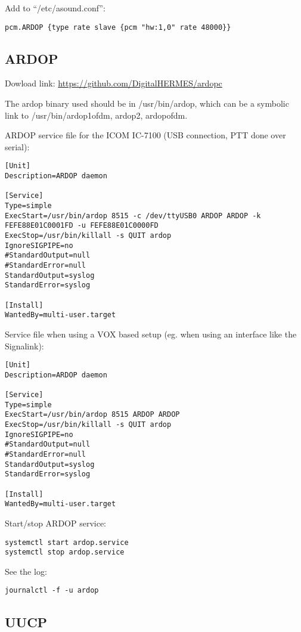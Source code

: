 \documentclass[11pt,a4paper]{article}
\begin{document}
Add to ``/etc/asound.conf'':
\begin{verbatim}
pcm.ARDOP {type rate slave {pcm "hw:1,0" rate 48000}}
\end{verbatim}

\subsection{ARDOP}

Dowload link: \url{https://github.com/DigitalHERMES/ardopc}

The ardop binary used should be in /usr/bin/ardop, which can be a
symbolic link to /usr/bin/{ardop1ofdm, ardop2, ardopofdm}.

ARDOP service file for the ICOM IC-7100 (USB connection, PTT done over serial):
\begin{verbatim}
[Unit]
Description=ARDOP daemon

[Service]
Type=simple
ExecStart=/usr/bin/ardop 8515 -c /dev/ttyUSB0 ARDOP ARDOP -k FEFE88E01C0001FD -u FEFE88E01C0000FD
ExecStop=/usr/bin/killall -s QUIT ardop
IgnoreSIGPIPE=no
#StandardOutput=null
#StandardError=null
StandardOutput=syslog
StandardError=syslog

[Install]
WantedBy=multi-user.target
\end{verbatim}

Service file when using a VOX based setup (eg. when using an interface like
the Signalink):
\begin{verbatim}
[Unit]
Description=ARDOP daemon

[Service]
Type=simple
ExecStart=/usr/bin/ardop 8515 ARDOP ARDOP
ExecStop=/usr/bin/killall -s QUIT ardop
IgnoreSIGPIPE=no
#StandardOutput=null
#StandardError=null
StandardOutput=syslog
StandardError=syslog

[Install]
WantedBy=multi-user.target
\end{verbatim}


Start/stop ARDOP service:
\begin{verbatim}
systemctl start ardop.service
systemctl stop ardop.service
\end{verbatim}


See the log:
\begin{verbatim}
journalctl -f -u ardop
\end{verbatim}

\subsection{UUCP}
\end{document}
